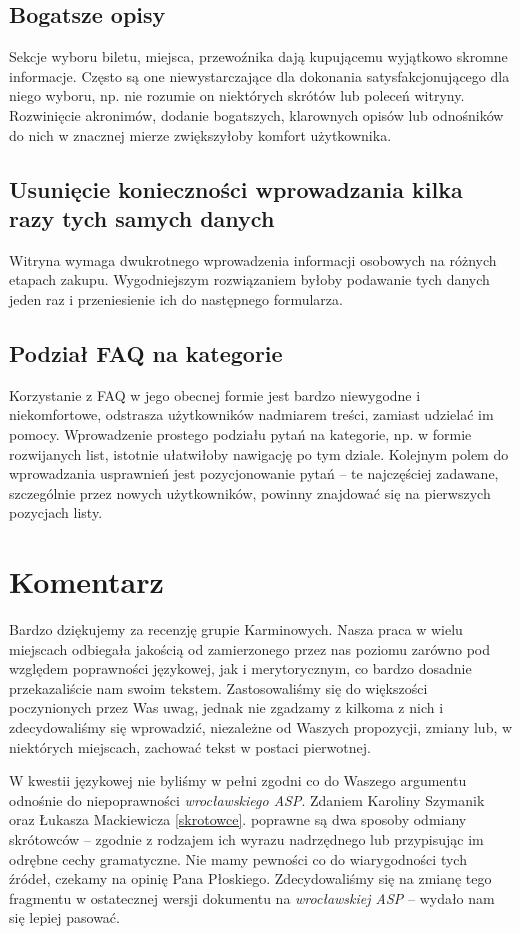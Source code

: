 \documentclass{article}
\begin{document}
\subsection{Bogatsze opisy}
Sekcje wyboru biletu, miejsca, przewoźnika dają kupującemu wyjątkowo skromne informacje.
Często są one niewystarczające dla dokonania satysfakcjonującego dla niego wyboru, np. nie rozumie on niektórych skrótów lub
poleceń witryny. Rozwinięcie akronimów, dodanie bogatszych, klarownych opisów lub odnośników do nich w znacznej mierze zwiększyłoby komfort użytkownika.
\subsection{Usunięcie konieczności wprowadzania kilka razy tych samych danych}
Witryna wymaga dwukrotnego wprowadzenia informacji osobowych na różnych etapach zakupu. Wygodniejszym rozwiązaniem byłoby
podawanie tych danych jeden raz i przeniesienie ich do następnego formularza.
\subsection{Podział FAQ na kategorie}
Korzystanie z FAQ w jego obecnej formie jest bardzo niewygodne i niekomfortowe, odstrasza użytkowników nadmiarem treści, zamiast udzielać im pomocy.
Wprowadzenie prostego podziału pytań na kategorie, np. w formie rozwijanych list, istotnie ułatwiłoby nawigację po tym dziale. Kolejnym polem do wprowadzania
usprawnień jest pozycjonowanie pytań -- te najczęściej zadawane, szczególnie przez nowych użytkowników, powinny znajdować się na pierwszych pozycjach listy.



\section{Komentarz}
Bardzo dziękujemy za recenzję grupie Karminowych. Nasza praca w wielu miejscach odbiegała jakością od zamierzonego przez nas poziomu zarówno pod względem
poprawności językowej, jak i merytorycznym, co bardzo dosadnie przekazaliście nam swoim tekstem. Zastosowaliśmy się do większości poczynionych przez Was uwag,
jednak nie zgadzamy z kilkoma z nich i zdecydowaliśmy się wprowadzić, niezależne od Waszych propozycji, zmiany lub, w niektórych miejscach, zachować
tekst w postaci pierwotnej.

W kwestii językowej nie byliśmy w pełni zgodni co do Waszego argumentu odnośnie do niepoprawności \emph{wrocławskiego ASP}.
Zdaniem Karoliny Szymanik oraz Łukasza Mackiewicza \ref{skrotowce}. poprawne są dwa sposoby odmiany skrótowców -- zgodnie z rodzajem ich wyrazu nadrzędnego lub przypisując im odrębne cechy gramatyczne. Nie mamy pewności co do wiarygodności tych źródeł, czekamy na opinię Pana Płoskiego. Zdecydowaliśmy się na zmianę tego fragmentu w ostatecznej wersji dokumentu na \emph{wrocławskiej ASP} -- wydało nam się lepiej pasować.
\end{document}
